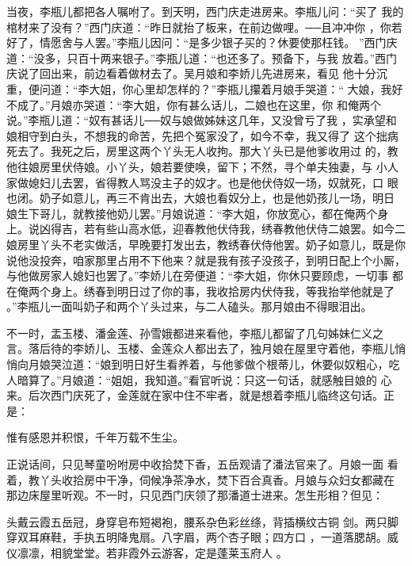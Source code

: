 当夜，李瓶儿都把各人嘱咐了。到天明，西门庆走进房来。李瓶儿问：“买了
我的棺材来了没有？”西门庆道：“昨日就抬了板来，在前边做哩。──且冲冲你
，你若好了，情愿舍与人罢。”李瓶儿因问：“是多少银子买的？休要使那枉钱。
”西门庆道：“没多，只百十两来银子。”李瓶儿道：“也还多了。预备下，与我
放着。”西门庆说了回出来，前边看着做材去了。吴月娘和李娇儿先进房来，看见
他十分沉重，便问道：“李大姐，你心里却怎样的？”李瓶儿攥着月娘手哭道：“
大娘，我好不成了。”月娘亦哭道：“李大姐，你有甚么话儿，二娘也在这里，你
和俺两个说。”李瓶儿道：“奴有甚话儿──奴与娘做姊妹这几年，又没曾亏了我
，实承望和娘相守到白头，不想我的命苦，先把个冤家没了，如今不幸，我又得了
这个拙病死去了。我死之后，房里这两个丫头无人收拘。那大丫头已是他爹收用过
的，教他往娘房里伏侍娘。小丫头，娘若要使唤，留下；不然，寻个单夫独妻，与
小人家做媳妇儿去罢，省得教人骂没主子的奴才。也是他伏侍奴一场，奴就死，口
眼也闭。奶子如意儿，再三不肯出去，大娘也看奴分上，也是他奶孩儿一场，明日
娘生下哥儿，就教接他奶儿罢。”月娘说道：“李大姐，你放宽心，都在俺两个身
上。说凶得吉，若有些山高水低，迎春教他伏侍我，绣春教他伏侍二娘罢。如今二
娘房里丫头不老实做活，早晚要打发出去，教绣春伏侍他罢。奶子如意儿，既是你
说他没投奔，咱家那里占用不下他来？就是我有孩子没孩子，到明日配上个小厮，
与他做房家人媳妇也罢了。”李娇儿在旁便道：“李大姐，你休只要顾虑，一切事
都在俺两个身上。绣春到明日过了你的事，我收拾房内伏侍我，等我抬举他就是了
。”李瓶儿一面叫奶子和两个丫头过来，与二人磕头。那月娘由不得眼泪出。

不一时，盂玉楼、潘金莲、孙雪娥都进来看他，李瓶儿都留了几句姊妹仁义之
言。落后待的李娇儿、玉楼、金莲众人都出去了，独月娘在屋里守着他，李瓶儿悄
悄向月娘哭泣道：“娘到明日好生看养着，与他爹做个根蒂儿，休要似奴粗心，吃
人暗算了。”月娘道：“姐姐，我知道。”看官听说：只这一句话，就感触目娘的
心来。后次西门庆死了，金莲就在家中住不牢者，就是想着李瓶儿临终这句话。正
是：

惟有感恩并积恨，千年万载不生尘。

正说话间，只见琴童吩咐房中收拾焚下香，五岳观请了潘法官来了。月娘一面
看着，教丫头收拾房中干净，伺候净茶净水，焚下百合真香。月娘与众妇女都藏在
那边床屋里听观。不一时，只见西门庆领了那潘道士进来。怎生形相？但见：

头戴云霞五岳冠，身穿皂布短褐袍，腰系杂色彩丝绦，背插横纹古铜
剑。两只脚穿双耳麻鞋，手执五明降鬼扇。八字眉，两个杏子眼；四方口
，一道落腮胡。威仪凛凛，相貌堂堂。若非霞外云游客，定是蓬莱玉府人
。

